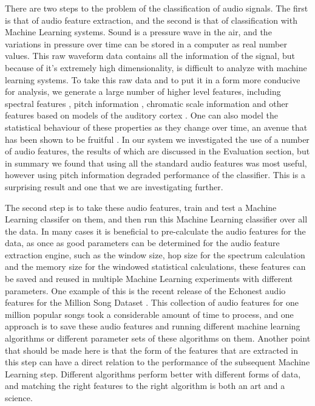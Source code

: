 \documentclass[12pt,oneside]{book}
\begin{document}
There are two steps to the problem of the classification of audio
signals.  The first is that of audio feature extraction, and the
second is that of classification with Machine Learning systems.  Sound
is a pressure wave in the air, and the variations in pressure over
time can be stored in a computer as real number values.  This raw
waveform data contains all the information of the signal, but because
of it's extremely high dimensionality, is difficult to analyze with
machine learning systems.  To take this raw data and to put it in a
form more conducive for analysis, we generate a large number of higher
level features, including spectral features \cite{marsyas}, pitch
information \cite{cheveigne02}, chromatic scale information
\cite{marsyas} and other features based on models of the auditory
cortex \cite{lyon82}.  One can also model the statistical behaviour of
these properties as they change over time, an avenue that has been
shown to be fruitful \cite{marsyas}.  In our system we investigated
the use of a number of audio features, the results of which are
discussed in the Evaluation section, but in summary we found that
using all the standard audio features was most useful, however using
pitch information degraded performance of the classifier.  This is a
surprising result and one that we are investigating further.

The second step is to take these audio features, train and test a
Machine Learning classifer on them, and then run this Machine Learning
classifier over all the data.  In many cases it is beneficial to
pre-calculate the audio features for the data, as once as good
parameters can be determined for the audio feature extraction engine,
such as the window size, hop size for the spectrum calculation and the
memory size for the windowed statistical calculations, these features
can be saved and reused in multiple Machine Learning experiments with
different parameters.  One example of this is the recent release of
the Echonest audio features for the Million Song Dataset
\cite{bertinmahieux11}.  This collection of audio features for one
million popular songs took a considerable amount of time to process,
and one approach is to save these audio features and running different
machine learning algorithms or different parameter sets of these
algorithms on them.  Another point that should be made here is that
the form of the features that are extracted in this step can have a
direct relation to the performance of the subsequent Machine Learning
step.  Different algorithms perform better with different forms of
data, and matching the right features to the right algorithm is both
an art and a science.
\end{document}
